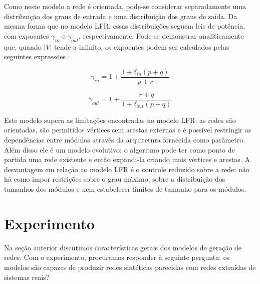 \documentclass{acm_proc_article-sp}
\begin{document}
Como neste modelo a rede é orientada, pode-se considerar separadamente uma distribuição dos graus de entrada e uma distribuição dos graus de saída. Da mesma forma que no modelo LFR, essas distribuições seguem leis de potência, com expoentes $\gamma_{in}$ e $\gamma_{out}$, respectivamente. Pode-se demonstrar analiticamente que, quando $|V|$ tende a infinito, os expoentes podem ser calculados pelas seguintes expressões \cite{Bollobas2003}:

\begin{equation}
\gamma_{in} = 1 + \frac{1 + \delta_{in}(p + q)}{p + r}
\end{equation}

\begin{equation}
\gamma_{out} = 1 + \frac{r + q}{1 + \delta_{out}(p + q)}
\end{equation}


Este modelo supera as limitações encontradas no modelo LFR: as redes são orientadas, são permitidos vértices sem arestas externas e é possível restringir as dependências entre módulos através da arquitetura fornecida como parâmetro. Além disso ele é um modelo evolutivo: o algoritmo pode ter como ponto de partida uma rede existente e então expandi-la criando mais vértices e arestas. A desvantagem em relação ao modelo LFR é o controle reduzido sobre a rede: não há como impor restrições sobre o grau máximo, sobre a distribuição dos tamanhos dos módulos e nem estabelecer limites de tamanho para os módulos.


\section{Experimento} \label{sec:experimento}

Na seção anterior discutimos características gerais dos modelos de geração de redes. Com o experimento, procuramos responder à seguinte pergunta: os modelos são capazes de produzir redes sintéticas parecidas com redes extraídas de sistemas reais? 
\end{document}
